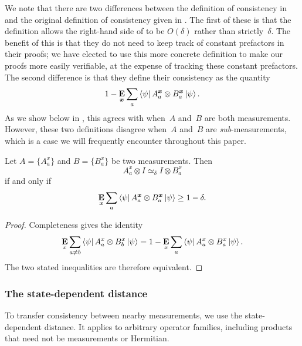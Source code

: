 \documentclass[11pt]{article}
\theoremstyle{definition}
\newcommand{\E}{\mathop{\bf E\/}}
\newcommand{\ot}{\otimes}
\newcommand{\bx}{{\boldsymbol{x}}}
\begin{document}
We note that there are two differences between the definition of consistency in 
and the original definition of consistency given in \cite[Definition 4.11]{NW19}.
The first of these is that the~\cite{NW19} definition
allows the right-hand side of  to be $O(\delta)$
rather than strictly~$\delta$.
The benefit of this is that they do not need to keep track of constant prefactors in their proofs;
we have elected to use this more concrete definition
to make our proofs more easily verifiable, at the expense of tracking these constant prefactors.
The second difference is that they define their consistency as the quantity
\begin{equation*}
1 - \E_{\bx} \sum_a \bra{\psi} A^{\bx}_a \ot B^{\bx}_a \ket{\psi}.
\end{equation*}
As we show below in ,
this agrees with 
when~$A$ and~$B$ are both measurements.
However, these two definitions disagree
when~$A$ and~$B$ are \emph{sub}-measurements,
which is a case we will frequently encounter throughout this paper.

\begin{proposition}\label{prop:simeq-for-measurements}
Let $A = \{A^x_a\}$ and $B = \{B^x_a\}$ be two measurements.
Then
\begin{equation*}
A^x_a \ot I \simeq_{\delta} I \ot B^x_a
\end{equation*}
if and only if
\begin{equation*}
\E_{\bx} \sum_a \bra{\psi} A^{\bx}_a \ot B^{\bx}_a \ket{\psi} \geq 1 - \delta.
\end{equation*}
\end{proposition}
\begin{proof}
Completeness gives the identity
\[
 \E_x\sum_{a\ne b}\bra\psi A_a^x\otimes B_b^x\ket\psi
 =1-\E_x\sum_a\bra\psi A_a^x\otimes B_a^x\ket\psi.
\]
The two stated inequalities are therefore equivalent.
\end{proof}

\subsubsection{The state-dependent distance}

To transfer consistency between nearby measurements, we use the
state-dependent distance.  It applies to arbitrary operator families,
including products that need not be measurements or Hermitian.
\end{document}
